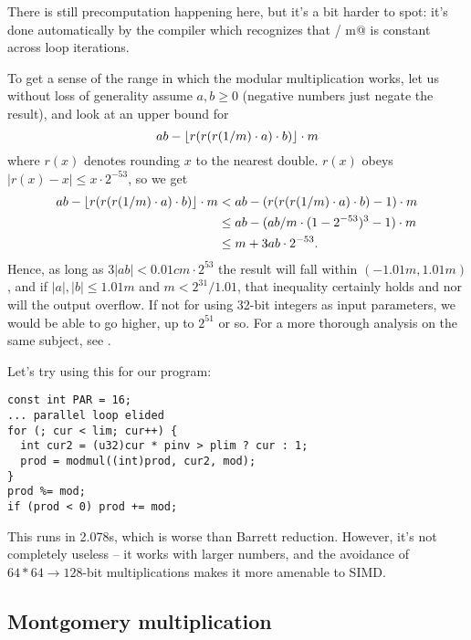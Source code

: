 There is still precomputation happening here, but it's a bit harder to spot: it's done automatically by the compiler which recognizes that  / m@ is constant across loop iterations.

To get a sense of the range in which the modular multiplication works, let us without loss of generality assume $a,b \ge 0$ (negative numbers just negate the result), and look at an upper bound for
\[ ab - \lfloor r(r(r(1/m)\cdot a)\cdot b)\rfloor \cdot m \]
where $r(x)$ denotes rounding $x$ to the nearest double.
$r(x)$ obeys $|r(x) - x| \le x \cdot 2^{-53}$, so we get
\begin{align*}
ab - \lfloor r(r(r(1/m)\cdot a)\cdot b)\rfloor \cdot m
&< ab - (r(r(r(1/m)\cdot a)\cdot b) - 1) \cdot m \\
&\le ab - (ab/m \cdot (1 - 2^{-53})^3 - 1) \cdot m \\
&\le m + 3ab \cdot 2^{-53}.
\end{align*}
Hence, as long as $3|ab| < 0.01 c m \cdot 2^{53}$ the result will fall within $(-1.01m, 1.01m)$, and if $|a|,|b| \le 1.01 m$ and $m < 2^{31} / 1.01$, that inequality certainly holds and nor will the output overflow. If not for using 32-bit integers as input parameters, we would be able to go higher, up to $2^{51}$ or so. For a more thorough analysis on the same subject, see \cite{modmulproof}.

Let's try using this for our program:

\begin{lstlisting}
const int PAR = 16;
... parallel loop elided
for (; cur < lim; cur++) {
  int cur2 = (u32)cur * pinv > plim ? cur : 1;
  prod = modmul((int)prod, cur2, mod);
}
prod %= mod;
if (prod < 0) prod += mod;
\end{lstlisting}

This runs in 2.078s, which is worse than Barrett reduction.
However, it's not completely useless -- it works with larger numbers, and the avoidance of \mbox{$64*64\rightarrow128$}-bit multiplications makes it more amenable to SIMD.

\subsection{Montgomery multiplication}


